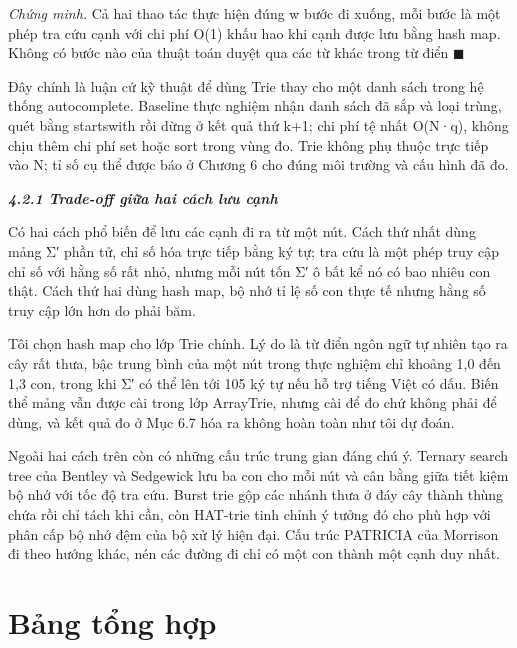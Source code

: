 \emph{Chứng minh.} Cả hai thao tác thực hiện đúng \textbar w\textbar{}
bước đi xuống, mỗi bước là một phép tra cứu cạnh với chi phí O(1) khấu
hao khi cạnh được lưu bằng hash map. Không có bước nào của thuật toán
duyệt qua các từ khác trong từ điển \(\blacksquare\)

Đây chính là luận cứ kỹ thuật để dùng Trie thay cho một danh sách trong
hệ thống autocomplete. Baseline thực nghiệm nhận danh sách đã sắp và
loại trùng, quét bằng startswith rồi dừng ở kết quả thứ k+1; chi phí tệ
nhất O(N·\textbar q\textbar), không chịu thêm chi phí set hoặc sort
trong vùng đo. Trie không phụ thuộc trực tiếp vào N; tỉ số cụ thể được
báo ở Chương 6 cho đúng môi trường và cấu hình đã đo.

\emph{\textbf{4.2.1 Trade-off giữa hai cách lưu cạnh}}

Có hai cách phổ biến để lưu các cạnh đi ra từ một nút. Cách thứ nhất
dùng mảng \textbar Σ′\textbar{} phần tử, chỉ số hóa trực tiếp bằng ký
tự; tra cứu là một phép truy cập chỉ số với hằng số rất nhỏ, nhưng mỗi
nút tốn \textbar Σ′\textbar{} ô bất kể nó có bao nhiêu con thật. Cách
thứ hai dùng hash map, bộ nhớ tỉ lệ số con thực tế nhưng hằng số truy
cập lớn hơn do phải băm.

Tôi chọn hash map cho lớp Trie chính. Lý do là từ điển ngôn ngữ tự nhiên
tạo ra cây rất thưa, bậc trung bình của một nút trong thực nghiệm chỉ
khoảng 1,0 đến 1,3 con, trong khi Σ′ có thể lên tới 105 ký tự nếu hỗ trợ
tiếng Việt có dấu. Biến thể mảng vẫn được cài trong lớp ArrayTrie, nhưng
cài để đo chứ không phải để dùng, và kết quả đo ở Mục 6.7 hóa ra không
hoàn toàn như tôi dự đoán.

Ngoài hai cách trên còn có những cấu trúc trung gian đáng chú ý. Ternary
search tree của Bentley và Sedgewick \cite{bentley1997} lưu ba con cho mỗi nút và
cân bằng giữa tiết kiệm bộ nhớ với tốc độ tra cứu. Burst trie \cite{heinz2002}
gộp các nhánh thưa ở đáy cây thành thùng chứa rồi chỉ tách khi cần, còn
HAT-trie \cite{askitis2007} tinh chỉnh ý tưởng đó cho phù hợp với phân cấp bộ nhớ
đệm của bộ xử lý hiện đại. Cấu trúc PATRICIA của Morrison \cite{morrison1968} đi
theo hướng khác, nén các đường đi chỉ có một con thành một cạnh duy
nhất.

\section{Bảng tổng hợp}
\label{sec:4-3}

\begin{center}
\end{center}

